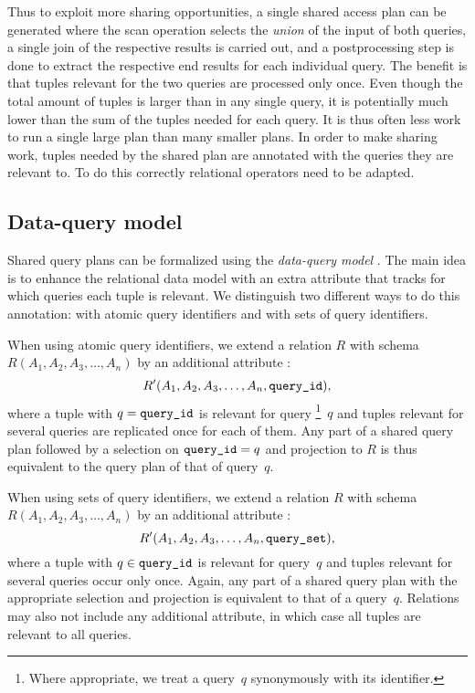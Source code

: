 Thus to exploit more sharing opportunities, a single shared access plan can be
generated where the scan operation selects the \emph{union} of the input of both
queries, a single join of the respective results is carried out, and a
postprocessing step is done to extract the respective end results for each
individual query.  The benefit is that tuples relevant for the two queries are
processed only once.  Even though the total amount of tuples is larger than in
any single query, it is potentially much lower than the sum of the tuples needed
for each query.  It is thus often less work to run a single large plan than many
smaller plans.  In order to make sharing work, tuples needed by the shared plan
are annotated with the queries they are relevant to. To do this correctly
relational operators need to be adapted.

\subsection{Data-query model}
\label{sec:dq_model}

Shared query plans can be formalized using the \emph{data-query model}
\cite{Giannikis:2012:SKO:2168651.2168654}.
The main idea is to enhance
the relational data model with an extra attribute that tracks for which queries
each tuple is relevant.  We distinguish two different ways to do this
annotation: with atomic query identifiers and with sets of query identifiers.

When using atomic query identifiers,
we extend a relation $R$ with schema $R(A_1, A_2, A_3, \dots, A_n)$
by an additional attribute \qid:
%
\begin{equation}
  R'(A_1, A_2, A_3,\dots, A_n, \text{{\texttt{query\_id}}}),
\end{equation}
%
where a tuple with $q = \text{{\texttt{query\_id}}}$ is relevant for query%
\footnote{Where appropriate, we treat a query~$q$
         synonymously with its identifier.}~$q$
and tuples relevant for several queries are replicated once for each of them.
Any part of a shared query plan followed by a selection on $\text{{\texttt{query\_id}}} = q$
and projection to $R$ is thus equivalent to the query plan of that of query~$q$.

When using sets of query identifiers,
we extend a relation $R$ with schema $R(A_1, A_2, A_3, \dots, A_n)$
by an additional attribute \qset:
%
\begin{equation}
  R'(A_1, A_2, A_3,\dots, A_n, \text{\texttt{query\_set}}),
\end{equation}
%
where a tuple with $q \in \text{{\texttt{query\_id}}}$ is relevant for query~$q$ and tuples
relevant for several queries occur only once.  Again, any part of a shared query
plan with the appropriate selection and projection is equivalent to that of a
query~$q$.  Relations may also not include any additional attribute, in which
case all tuples are relevant to all queries.

